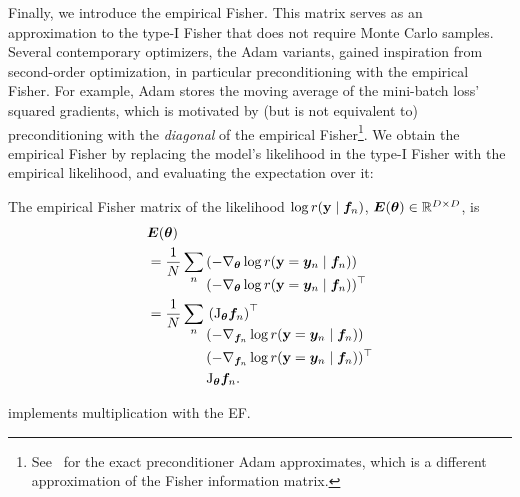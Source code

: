 Finally, we introduce the empirical Fisher.
This matrix serves as an approximation to the type-I Fisher that does not require Monte Carlo samples.
Several contemporary optimizers, \eg the Adam variants, gained inspiration from second-order optimization, in particular preconditioning with the empirical Fisher.
For example, Adam \cite{kingma2015adam} stores the moving average of the mini-batch loss' squared gradients, which is motivated by (but is not equivalent to) preconditioning with the \emph{diagonal} of the empirical Fisher\footnote{See~\citet{lin2024can} for the exact preconditioner Adam approximates, which is a different approximation of the Fisher information matrix.}.
We obtain the empirical Fisher by replacing the model's likelihood in the type-I Fisher with the empirical likelihood, and evaluating the expectation over it:

\begin{definition}\label{def:emp_fisher}%
  The empirical Fisher matrix of the likelihood $\log r({\mathbf{y}} \mid {\bm{f}}_n)$,
  ${\bm{E}}({\bm{\theta}}) \in {\mathbb{R}}^{D \times D}$, is
  \begin{align*}
    & {\bm{E}}({\bm{\theta}}) \\
	& = \frac{1}{N} \sum_{n}
	\begin{aligned}[t]
	   & (-\nabla_{{\bm{\theta}}} \log r({\mathbf{y}} = {\bm{y}}_n \mid {\bm{f}}_n))        \\
	   & (-\nabla_{{\bm{\theta}}} \log r({\mathbf{y}} = {\bm{y}}_n \mid {\bm{f}}_n))^{\top} \\
	\end{aligned} \\
    & = \frac{1}{N} \sum_{n}
    \begin{aligned}[t]
       & \left(\mathrm{J}_{{\bm{\theta}}}{\bm{f}}_n\right)^{\top}                  \\
       & (-\nabla_{{\bm{f}}_n} \log r({\mathbf{y}} = {\bm{y}}_n \mid {\bm{f}}_n))        \\
       & (-\nabla_{{\bm{f}}_n} \log r({\mathbf{y}} = {\bm{y}}_n \mid {\bm{f}}_n))^{\top} \\
       & \mathrm{J}_{{\bm{\theta}}}{\bm{f}}_n.
    \end{aligned}
  \end{align*}
\end{definition}

\switchcolumn[1]
\switchcolumn[0]

 implements multiplication with the EF.

